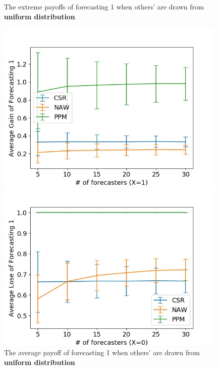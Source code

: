 \documentclass[english,10pt]{article}
\begin{document}
\begin{enumerate}
\begin{figure}[H]
\begin{minipage}{0.48\textwidth}
        	\end{minipage}
        	\caption{The  extreme payoffs of forecasting 1 when others' are drawn from \textbf{uniform distribution}}
        	\end{figure}
	
	\begin{figure}[H]
        	\centering
        	\begin{minipage}{0.48\textwidth}
        	\includegraphics[width = \textwidth]{Ind(UnifF_UnifW)Avg_gain_of_forecasting_1.jpg}
        	\end{minipage}
        	\begin{minipage}{0.48\textwidth}
        	\includegraphics[width = \textwidth]{Ind(UnifF_UnifW)Avg_lose_of_forecasting_1.jpg}
        	\end{minipage}
        	\caption{The  average payoff of forecasting 1 when others' are drawn from \textbf{uniform distribution}}
        	\end{figure}
	

\end{enumerate}
\end{document}
